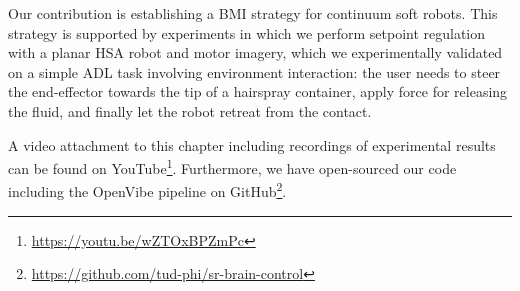 Our contribution is establishing a \gls{BMI} strategy for continuum soft robots. This strategy is supported by experiments in which we perform setpoint regulation with a planar \gls{HSA} robot and motor imagery, which we experimentally validated on a simple \gls{ADL} task involving environment interaction: the user needs to steer the end-effector towards the tip of a hairspray container, apply force for releasing the fluid, and finally let the robot retreat from the contact.          

A video attachment to this chapter including recordings of experimental results can be found on YouTube\footnote{\url{https://youtu.be/wZTOxBPZmPc}}.
Furthermore, we have open-sourced our code including the OpenVibe pipeline on GitHub\footnote{\url{https://github.com/tud-phi/sr-brain-control}}.